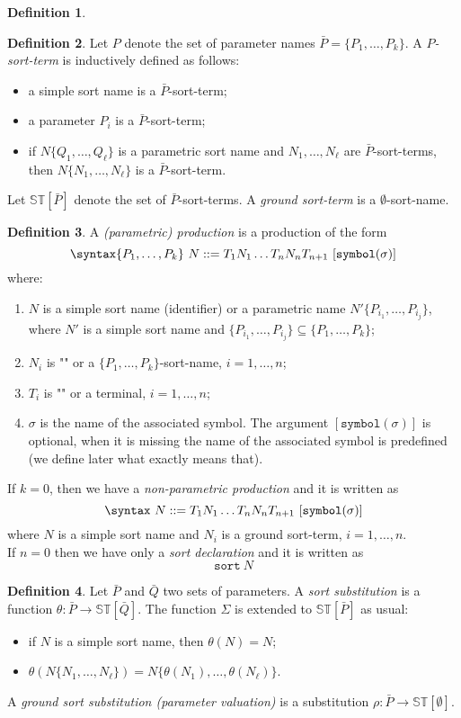 \documentclass{article}
\theoremstyle{definition}
\theoremstyle{definition}
\theoremstyle{definition}
\newtheorem{definition}{Definition}[section]
\theoremstyle{definition}
\theoremstyle{definition}
\theoremstyle{theorem}
\theoremstyle{theorem}
\theoremstyle{theorem}
\theoremstyle{theorem}
\theoremstyle{theorem}
\newcommand{\KWsymbol}{\texttt{symbol}}
\newcommand{\sort}{\texttt{sort}}
\newcommand{\ST}{\mathbb{ST}}
\begin{document}
{\begin{definition}
\end{definition}

\begin{definition}
Let $P$ denote the set of parameter names $\bar{P}=\{P_1,\ldots,P_k\}$. A \emph{$P$-sort-term} is inductively defined as follows:
\begin{itemize}
\item a simple sort name is a $\bar{P}$-sort-term;
\item a parameter $P_i$ is a $\bar{P}$-sort-term;
\item if $N\{Q_1,\ldots,Q_\ell\}$ is a parametric sort name and $N_1,\ldots,N_\ell$ are $\bar{P}$-sort-terms, then $N\{N_1,\ldots,N_\ell\}$ is a $\bar{P}$-sort-term.
\end{itemize}
Let $\ST[\bar{P}]$ denote the set of $\bar{P}$-sort-terms. A \emph{ground sort-term} is a  $\emptyset$-sort-name.
\end{definition}


\begin{definition}
A \emph{(parametric) production} is a production of the form
\[\syntax\{P_1,\ldots,P_k\}\ N ::= T_1 N_1 \ldots T_n N_n T_{n+1}\ [\KWsymbol(\sigma)]\]
where:
\begin{enumerate}
\item $N$ is a simple sort name (identifier) or a parametric name $N'\{P_{i_1},\ldots,P_{i_j}\}$, where $N'$ is a simple sort name and $\{P_{i_1},\ldots,P_{i_j}\}\subseteq\{P_1,\ldots,P_k\}$;
\item $N_i$ is ""  or a $\{P_1,\ldots,P_k\}$-sort-name, $i=1,\ldots,n$;
\item $T_i$ is "" or a terminal, $i=1,\ldots,n$;
\item $\sigma$ is the name of the associated symbol. The argument $[\KWsymbol(\sigma)]$ is optional, when it is missing the name of the associated symbol is predefined (we define later what exactly means that).
\end{enumerate}
If $k=0$, then we have a \emph{non-parametric production} and it is written as
\[\syntax\ N ::= T_1 N_1 \ldots T_n N_n T_{n+1}\ [\KWsymbol(\sigma)]\]
where $N$ is a simple sort name and $N_i$ is a ground sort-term, $i=1,\ldots,n$.
\\
If $n=0$ then we have only a \emph{sort declaration} and it is written as
\[\sort\ N \]
\end{definition}

\begin{definition}
Let $\bar{P}$ and $\bar{Q}$ two sets of parameters. A \emph{sort substitution} is a function $\theta:\bar{P}\to \ST[\bar{Q}]$. The function $\Sigma$ is extended to $\ST[\bar{P}]$ as usual:
\begin{itemize}
\item if $N$ is a simple sort name, then $\theta(N)=N$;
\item $\theta(N\{N_1,\ldots,N_\ell\})=N\{\theta(N_1),\ldots,\theta(N_\ell)\}$.
\end{itemize}
A \emph{ground sort substitution (parameter valuation)} is a substitution $\rho:\bar{P}\to \ST[\emptyset]$.
\end{definition}

}
\end{document}

